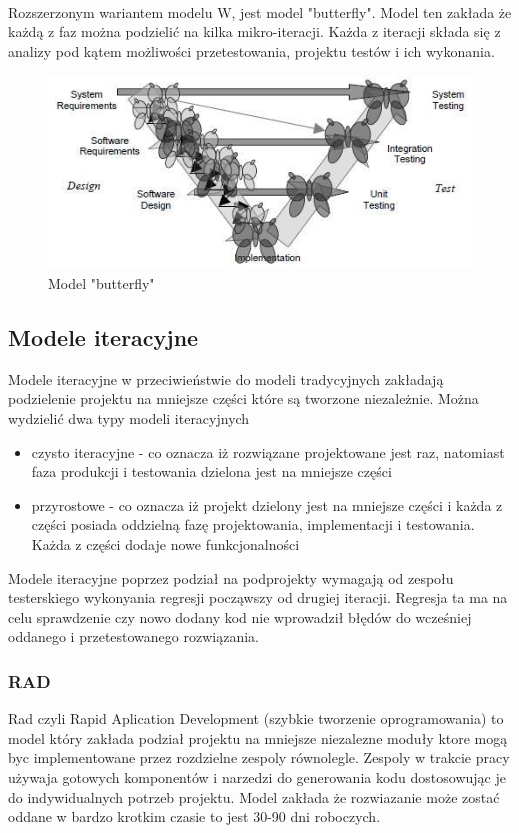 \paragraph{}
Rozszerzonym wariantem modelu W, jest model "butterfly"\cite{BUTTERFLY}. Model ten zakłada że każdą z faz można podzielić na kilka mikro-iteracji. Każda z iteracji składa się z analizy pod kątem możliwości przetestowania, projektu testów i ich wykonania. 
\begin{figure}[h]
\centerline{\includegraphics[scale=0.5]{img/butterflymodel2.JPG}}
\caption{Model "butterfly"}
\label{fig:vmodel}
\end{figure}
\subsection{Modele iteracyjne}
Modele iteracyjne w przeciwieństwie do modeli tradycyjnych zakładają podzielenie projektu na mniejsze części które są tworzone niezależnie. Można wydzielić dwa typy modeli iteracyjnych
\begin{itemize}
  \item czysto iteracyjne - co oznacza iż rozwiązane projektowane jest raz, natomiast faza produkcji i testowania dzielona jest na mniejsze części
  \item przyrostowe - co oznacza iż projekt dzielony jest na mniejsze części i każda z części posiada oddzielną fazę projektowania, implementacji i testowania. Każda z części dodaje nowe funkcjonalności
 
\end{itemize}
 Modele iteracyjne poprzez podział na podprojekty wymagają od zespołu testerskiego wykonyania regresji począwszy od drugiej iteracji. Regresja ta ma na celu sprawdzenie czy nowo dodany kod nie wprowadził błędów do wcześniej oddanego i przetestowanego rozwiązania.
\subsubsection{RAD}
Rad czyli Rapid Aplication Development (szybkie tworzenie oprogramowania) to model który zakłada podział projektu na mniejsze
 niezalezne moduły ktore mogą byc implementowane przez rozdzielne zespoly równolegle. Zespoly w trakcie pracy używaja gotowych komponentów i narzedzi do generowania kodu dostosowując je do indywidualnych potrzeb projektu. Model zakłada że rozwiazanie może zostać oddane w bardzo krotkim czasie to jest 30-90 dni roboczych.

